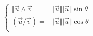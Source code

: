 \begin{displaymath}
 \left\lbrace 
\begin{aligned}
 \Vert \overrightarrow u \wedge \overrightarrow v \Vert
=& \vert \overrightarrow u \Vert \vert \overrightarrow u \Vert \sin \theta \\
(\overrightarrow u /\overrightarrow v )
=& \vert \overrightarrow u \Vert \vert \overrightarrow u \Vert \cos \theta \\
\end{aligned}
\right. 
\end{displaymath}
